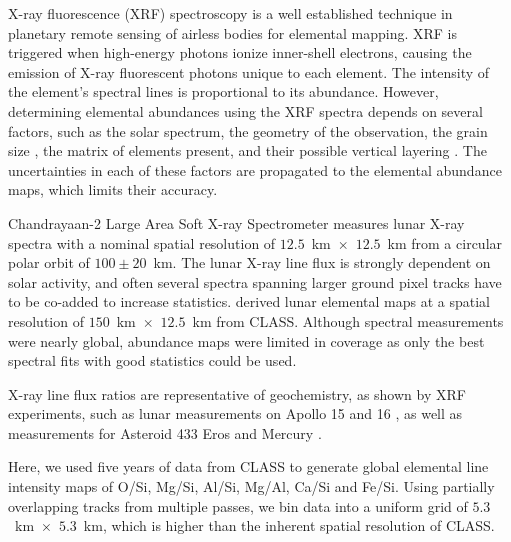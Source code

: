 \documentclass[twocolumn]{aastex631}
\begin{document}
X-ray fluorescence (XRF) spectroscopy is a well established technique in planetary remote sensing of airless bodies \citep{1972Sci...175..436A, adler1972, 2009Icar..200..129L, 2009P&SS...57..744S, 2011Icar..214...53N, 2011Sci...333.1847N,2014Icar..229..254W,2016RAA....16....4D} for elemental mapping.  XRF is triggered when high-energy photons ionize inner-shell electrons, causing the emission of X-ray fluorescent photons unique to each element. The intensity of the element's spectral lines is proportional to its abundance. However, determining elemental abundances using the XRF spectra  depends on several factors, such as the solar spectrum, the geometry of the observation, the grain size , the matrix of elements present, and their possible vertical layering \citep{1966JaJAP...5..886S, 1979PhDT.......224C,1997JGR...10216361C,1997LPI....28.1039O,2008EP&S...60..293M,2008EPS...60..283O,2008Icar..198..408N,2009AdSpR..44..313N,2011P&SS...59.1393W, ATHIRAY2013188, 2013PSS...89..183A}. The uncertainties in each of these factors are propagated to the elemental abundance maps, which limits their accuracy. 

Chandrayaan-2 Large Area Soft X-ray Spectrometer \citep[CLASS;][]{vatedka2020chandrayaan} measures lunar X-ray spectra with a nominal spatial resolution of $12.5$~km~$\times$~$12.5$~km from a circular polar orbit of $100 \pm 20$~km. The lunar X-ray line flux is strongly dependent on solar activity, and often several spectra spanning larger ground pixel tracks have to be co-added to increase statistics. \citet{2024Icar..41015898N} derived lunar elemental maps at a spatial resolution of $150$~km~$\times$~$12.5$~km from CLASS. Although spectral measurements were nearly global, abundance maps were limited in coverage as only the best spectral fits with good statistics could be used. 

X-ray line flux ratios are representative of geochemistry, as shown by XRF experiments, such as lunar measurements on Apollo 15 \citep{1972Sci...175..436A} and 16 \citep{adler1972}, as well as measurements for Asteroid 433 Eros \citep{2009Icar..200..129L} and Mercury \citep{weider2015, 2020Icar..34513716N}.

Here, we used five years of data from CLASS to generate global elemental line intensity maps of O/Si, Mg/Si, Al/Si, Mg/Al, Ca/Si and Fe/Si. Using partially overlapping tracks from multiple passes, we bin data into a uniform grid of $5.3$~km~$\times$~$5.3$~km, which is higher than the inherent spatial resolution of CLASS.
\end{document}
